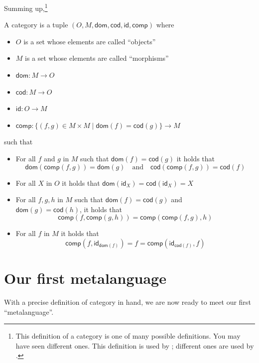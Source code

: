 Summing up,\footnote{This definition of a category is one of many possible definitions. 
You may have seen different ones. This definition is used by \citep{crole1993categories}; 
different ones are used by \citep{mac1998categories}.}
\begin{definition}[Category]
  \sloppy
  A category is a tuple \((O,M,\mathsf{dom},\mathsf{cod},\mathsf{id},\mathsf{comp})\)
  where
  \begin{itemize}[noitemsep]
  \item $O$ is a set whose elements are called ``objects''
  \item $M$ is a set whose elements are called ``morphisms''
  \item $\mathsf{dom} : M\to O$
  \item $\mathsf{cod} : M \to O$
  \item $\mathsf{id} : O\to M$
  \item $\mathsf{comp} : \{(f,g) \in M \times M \mid \mathsf{dom}(f) = \mathsf{cod}(g)\} \to M$
  \end{itemize}
  such that
  \begin{itemize}[noitemsep]
  \item For all \(f\) and \(g\) in \(M\) such that \(\mathsf{dom}(f) = \mathsf{cod}(g)\)
    it holds that
    \[
    \mathsf{dom}(\mathsf{comp}(f,g)) = \mathsf{dom}(g)
    \quad\text{and}\quad
    \mathsf{cod}(\mathsf{comp}(f,g)) = \mathsf{cod}(f)
    \]
  \item For all \(X\) in \(O\) it holds that \(\mathsf{dom}(\mathsf{id}_X) = \mathsf{cod}(\mathsf{id}_X) = X\)
  \item For all $f,g,h$ in $M$ such that
  $\mathsf{dom}(f) = \mathsf{cod}(g)$ and\\
  $\mathsf{dom}(g) = \mathsf{cod}(h)$, it holds that
  $$\mathsf{comp}(f,\mathsf{comp}(g,h)) = \mathsf{comp}(\mathsf{comp}(f,g),h)$$
  \item For all $f$ in $M$ it holds that $$\mathsf{comp}(f,\mathsf{id}_{\mathsf{dom}(f)})=f=\mathsf{comp}(\mathsf{id}_{\mathsf{cod}(f)}, f)$$
  \end{itemize}
\end{definition}

\section{Our first metalanguage}

With a precise definition of category in hand, we are now ready to meet our first
``metalanguage''.

